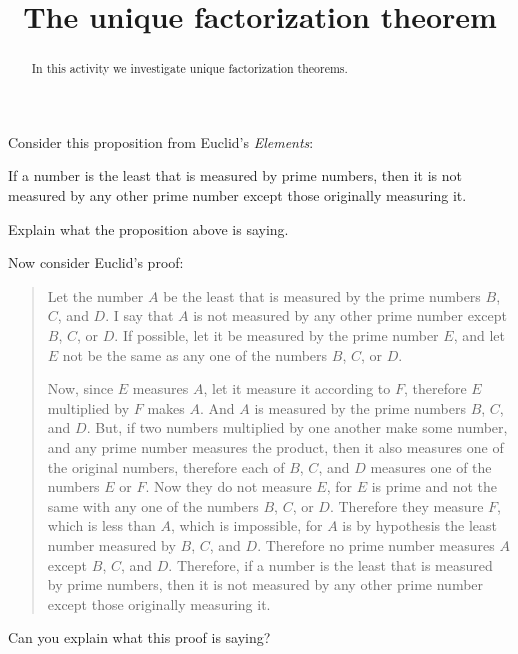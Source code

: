\documentclass[nooutcomes]{ximera}
\title{The unique factorization theorem}
\begin{document}
\begin{abstract}
In this activity we investigate unique factorization theorems.
\end{abstract}
\maketitle


Consider this proposition from Euclid's \textit{Elements}:

\begin{proposition}[IX.14]
If a number is the least that is measured by prime numbers, then it is
not measured by any other prime number except those originally
measuring it.
\end{proposition}

\begin{question}
Explain what the proposition above is saying.
\end{question}


\begin{question}
Now consider Euclid's proof:
\begin{quote}
Let the number $A$ be the least that is measured by the prime numbers
$B$, $C$, and $D$.  I say that $A$ is not measured by any other prime
number except $B$, $C$, or $D$.  If possible, let it be measured by
the prime number $E$, and let $E$ not be the same as any one of the
numbers $B$, $C$, or $D$.

Now, since $E$ measures $A$, let it measure it according to $F$, therefore $E$
multiplied by $F$ makes $A$. And $A$ is measured by the prime numbers $B$, $C$,
and $D$.  But, if two numbers multiplied by one another make some
number, and any prime number measures the product, then it also
measures one of the original numbers, therefore each of $B$, $C$, and $D$
measures one of the numbers $E$ or $F$.  Now they do not measure $E$, for $E$
is prime and not the same with any one of the numbers $B$, $C$, or
$D$. Therefore they measure $F$, which is less than $A$, which is
impossible, for $A$ is by hypothesis the least number measured by $B$, $C$,
and $D$.  Therefore no prime number measures $A$ except $B$, $C$, and $D$.
Therefore, if a number is the least that is measured by prime numbers,
then it is not measured by any other prime number except those
originally measuring it.
\end{quote}
Can you explain what this proof is saying?
\end{question}

\end{document}
